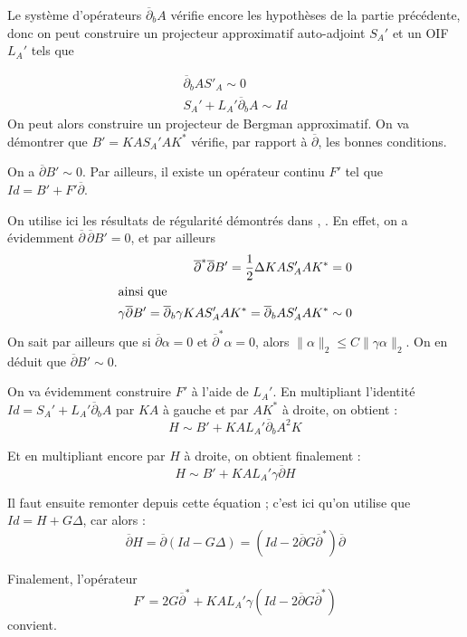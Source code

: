 Le système d'opérateurs $\overline{\partial}_bA$ vérifie encore les hypothèses de la partie précédente, donc on peut construire un projecteur approximatif auto-adjoint $S_A'$ et un OIF $L_A'$ tels que
 
\begin{align*}
  \overline{\partial}_bAS'_A\sim 0\\
  S_A' + L_A'\overline{\partial}_bA\sim Id
\end{align*}
On peut alors construire un projecteur de Bergman approximatif. On va démontrer que $B' = KAS_A'AK^*$ vérifie, par rapport à $\overline{\partial}$, les bonnes conditions.
\begin{lem}
On a $\overline{\partial}B' \sim 0$. Par ailleurs, il existe un opérateur continu $F'$ tel que $Id=B'+F'\overline{\partial}$.
\end{lem}
\begin{preuve}
On utilise ici les résultats de régularité démontrés dans \cite{kohn1963harmonic}, \cite{kohn1964harmonic}. En effet, on a évidemment $\overline{\partial}\,\overline{\partial}B'=0$, et par ailleurs 
\begin{align*}
  \overline{\partial}^*\overline{\partial}B' = \frac{1}{2} \Delta KAS_A'AK^* = 0\\
  \intertext{ainsi que}
  \gamma \overline{\partial} B' = \overline{\partial}_b\gamma KAS_A'AK^* = \overline{\partial}_bAS_A'AK^* \sim 0
\end{align*}
\noindent On sait par ailleurs que si $\overline{\partial}\alpha=0$ et $\overline{\partial}^*\alpha =0$, alors $\|\alpha\|_2 \leq C\|\gamma \alpha\|_2$. On en déduit que $\overline{\partial}B' \sim 0$.

On va évidemment construire $F'$ à l'aide de $L_A'$. En multipliant l'identité $Id = S_A' + L_A'\overline{\partial}_bA$ par $KA$ à gauche et par $AK^*$ à droite, on obtient :
\begin{equation*}
  H \sim B' + KAL_A'\overline{\partial}_bA^2K
\end{equation*}

\noindent Et en multipliant encore par $H$ à droite, on obtient finalement :
\begin{equation*}
  H \sim B' + KAL_A'\gamma\overline{\partial}H
\end{equation*}

\noindent Il faut ensuite remonter depuis cette équation ; c'est ici qu'on utilise que $Id=H+G\Delta$, car alors :
\begin{equation*}
  \overline{\partial}H = \overline{\partial}(Id-G\Delta) = (Id - 2\overline{\partial}G\overline{\partial}^*)\overline{\partial}
\end{equation*}

\noindent Finalement, l'opérateur 
\begin{equation*}
  F' = 2G\overline{\partial}^* + KAL_A'\gamma(Id-2\overline{\partial}G\overline{\partial}^*)
\end{equation*}
\noindent convient.
\end{preuve}

